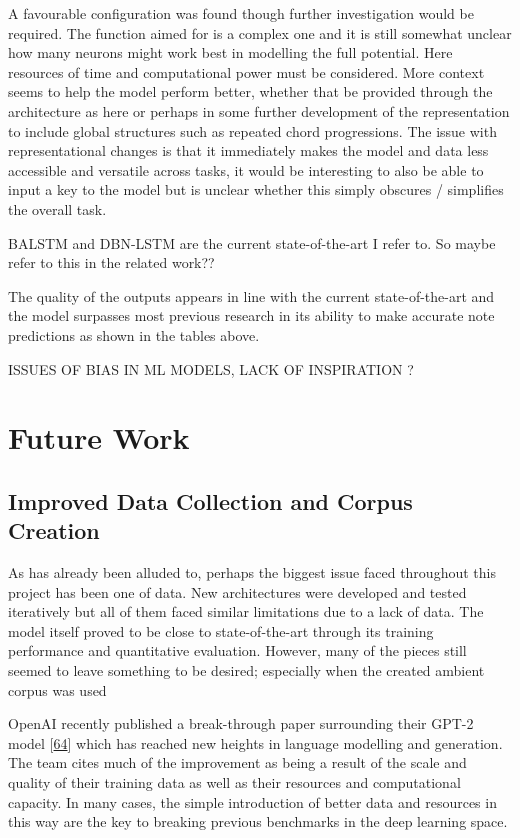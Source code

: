 \documentclass[12pt,]{article}
\begin{document}
A favourable configuration was found though further investigation would
be required. The function aimed for is a complex one and it is still
somewhat unclear how many neurons might work best in modelling the full
potential. Here resources of time and computational power must be
considered. More context seems to help the model perform better, whether
that be provided through the architecture as here or perhaps in some
further development of the representation to include global structures
such as repeated chord progressions. The issue with representational
changes is that it immediately makes the model and data less accessible
and versatile across tasks, it would be interesting to also be able to
input a key to the model but is unclear whether this simply obscures /
simplifies the overall task.

BALSTM and DBN-LSTM are the current state-of-the-art I refer to. So
maybe refer to this in the related work??

The quality of the outputs appears in line with the current
state-of-the-art and the model surpasses most previous research in its
ability to make accurate note predictions as shown in the tables above.

ISSUES OF BIAS IN ML MODELS, LACK OF INSPIRATION ?

\hypertarget{future-work}{%
\section{Future Work}\label{future-work}}

\hypertarget{improved-data-collection-and-corpus-creation}{%
\subsection{Improved Data Collection and Corpus
Creation}\label{improved-data-collection-and-corpus-creation}}

As has already been alluded to, perhaps the biggest issue faced
throughout this project has been one of data. New architectures were
developed and tested iteratively but all of them faced similar
limitations due to a lack of data. The model itself proved to be close
to state-of-the-art through its training performance and quantitative
evaluation. However, many of the pieces still seemed to leave something
to be desired; especially when the created ambient corpus was used

OpenAI recently published a break-through paper surrounding their GPT-2
model {[}\protect\hyperlink{ref-radford2018language}{64}{]} which has
reached new heights in language modelling and generation. The team cites
much of the improvement as being a result of the scale and quality of
their training data as well as their resources and computational
capacity. In many cases, the simple introduction of better data and
resources in this way are the key to breaking previous benchmarks in the
deep learning space.
\end{document}
